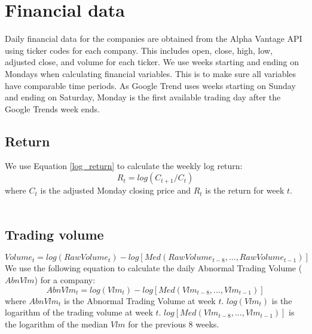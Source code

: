 \section{Financial data}
Daily financial data for the companies are obtained from the Alpha Vantage API using ticker codes for each company. This includes open, close, high, low, adjusted close, and volume for each ticker. We use weeks starting and ending on Mondays when calculating financial variables. This is to make sure all variables have comparable time periods. As Google Trend uses weeks starting on Sunday and ending on Saturday, Monday is the first available trading day after the Google Trends week ends. 
\subsection*{Return}
We use Equation \eqref{log_return} to calculate the weekly log return:
\begin{equation}
   \label{log_return} 
   R_t = log (C_{t+1}/C_{t}) 
\end{equation}
where $C_{t}$ is the adjusted Monday closing price and $R_{t}$ is the return for week $t$.
\\\\
\subsection*{Trading volume}
\begin{equation}
   \label{abnormal_volume} 
   Volume_{t} = log(RawVolume_{t}) - log[Med(RawVolume_{t-8},...,RawVolume_{t-1})] 
\end{equation}
We use the following equation to calculate the daily Abnormal Trading Volume ($AbnVlm$) for a company: 
\begin{equation}
   \label{abnormal_volume} 
   AbnVlm_{t} = log(Vlm_{t}) - log[Med(Vlm_{t-8},...,Vlm_{t-1})] 
\end{equation}
   where $AbnVlm_t$ is the Abnormal Trading Volume at week $t$. $log(Vlm_{t})$ is the logarithm of the trading volume at week $t$. $log[Med(Vlm_{t-8},...,Vlm_{t-1})]$ is the logarithm of the median $Vlm$ for the previous 8 weeks.
